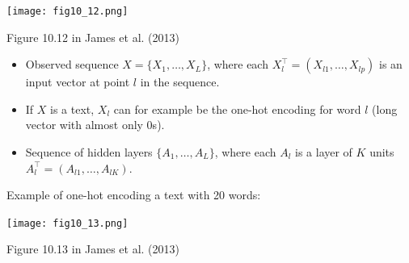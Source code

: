 \documentclass[
  10pt,
  ignorenonframetext,
  twocolumn]{beamer}
\providecommand{\tightlist}{%
  \setlength{\itemsep}{0pt}\setlength{\parskip}{0pt}}
\begin{document}
\begin{frame}
\centering

\texttt{[image: fig10\_12.png]}

\scriptsize Figure 10.12 in James et al. (2013)

\vspace{2mm}

\normalsize

\begin{itemize}
\tightlist
\item
  Observed sequence \(X=\{ X_1, \ldots , X_L \}\), where each
  \(X_l^\top=(X_{l1},\ldots, X_{lp})\) is an input vector at point \(l\)
  in the sequence.
\end{itemize}

\vspace{2mm}

\begin{itemize}
\tightlist
\item
  If \(X\) is a text, \(X_l\) can for example be the one-hot encoding
  for word \(l\) (long vector with almost only 0s).
\end{itemize}

\vspace{2mm}

\begin{itemize}
\tightlist
\item
  Sequence of hidden layers \(\{ A_1, \ldots, A_L \}\), where each
  \(A_l\) is a layer of \(K\) units
  \(A_l^\top = (A_{l1}, \ldots , A_{lK})\).
\end{itemize}
\end{frame}

\begin{frame}
Example of one-hot encoding a text with 20 words:

\texttt{[image: fig10\_13.png]}

\scriptsize

Figure 10.13 in James et al. (2013)
\end{frame}
\end{document}
